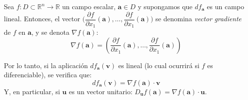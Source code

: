 %
\begin{definicion}\label{def:grad}
Sea $f\colon \mathit{D}\subset \mathbb{R}^n\to \mathbb{R}$ un campo escalar, $\boldsymbol a\in \mathit{D}$ y supongamos que $df_{\boldsymbol a}$ es un campo lineal.
Entonces, el vector $\big(\dfrac{\partial f}{\partial x_1}(\boldsymbol a),\dots,
\dfrac{\partial f}{\partial x_1}(\boldsymbol a)\big)$ se denomina \emph{vector gradiente}  de $f$ en $\boldsymbol a$, y se denota $\nabla f(\boldsymbol a)$:
\[
\nabla f(\boldsymbol a)=
\left(\dfrac{\partial f}{\partial x_1}(\boldsymbol a),\dots,
\dfrac{\partial f}{\partial x_1}(\boldsymbol a)\right)
\]
\end{definicion}

Por lo tanto, si la aplicación $df_{\boldsymbol a}(\boldsymbol v)$ es lineal (lo cual ocurrirá si $f$ es diferenciable), se verifica que:
\[
df_{\boldsymbol a}(\boldsymbol v) =\nabla f(\boldsymbol a)\cdot\boldsymbol v
\]
Y, en particular, si $\boldsymbol u$ es un vector unitario: $D_{\boldsymbol u}f(\boldsymbol a)=\nabla f(\boldsymbol a)\cdot\boldsymbol u$.


%
%
%

